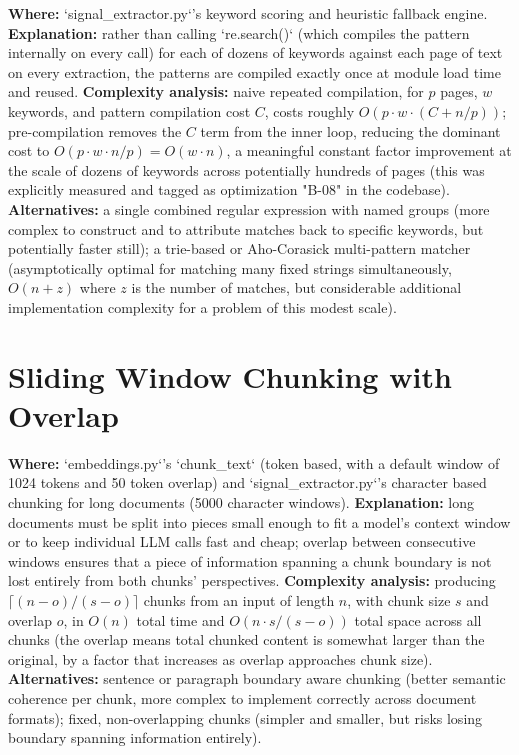 \documentclass[11pt,a4paper]{report}
\begin{document}
\textbf{Where:} `signal\_extractor.py`'s keyword scoring and heuristic fallback engine.
\textbf{Explanation:} rather than calling `re.search()` (which compiles the pattern internally on every call) for each of dozens of keywords against each page of text on every extraction, the patterns are compiled exactly once at module load time and reused.
\textbf{Complexity analysis:} naive repeated compilation, for $p$ pages, $w$ keywords, and pattern compilation cost $C$, costs roughly $O(p \cdot w \cdot (C + n/p))$; pre-compilation removes the $C$ term from the inner loop, reducing the dominant cost to $O(p \cdot w \cdot n/p) = O(w \cdot n)$, a meaningful constant factor improvement at the scale of dozens of keywords across potentially hundreds of pages (this was explicitly measured and tagged as optimization "B-08" in the codebase).
\textbf{Alternatives:} a single combined regular expression with named groups (more complex to construct and to attribute matches back to specific keywords, but potentially faster still); a trie-based or Aho-Corasick multi-pattern matcher (asymptotically optimal for matching many fixed strings simultaneously, $O(n + z)$ where $z$ is the number of matches, but considerable additional implementation complexity for a problem of this modest scale).

\section{Sliding Window Chunking with Overlap}

\textbf{Where:} `embeddings.py`'s `chunk\_text` (token based, with a default window of 1024 tokens and 50 token overlap) and `signal\_extractor.py`'s character based chunking for long documents (5000 character windows).
\textbf{Explanation:} long documents must be split into pieces small enough to fit a model's context window or to keep individual LLM calls fast and cheap; overlap between consecutive windows ensures that a piece of information spanning a chunk boundary is not lost entirely from both chunks' perspectives.
\textbf{Complexity analysis:} producing $\lceil (n - o) / (s - o) \rceil$ chunks from an input of length $n$, with chunk size $s$ and overlap $o$, in $O(n)$ total time and $O(n \cdot s/(s-o))$ total space across all chunks (the overlap means total chunked content is somewhat larger than the original, by a factor that increases as overlap approaches chunk size).
\textbf{Alternatives:} sentence or paragraph boundary aware chunking (better semantic coherence per chunk, more complex to implement correctly across document formats); fixed, non-overlapping chunks (simpler and smaller, but risks losing boundary spanning information entirely).
\end{document}
